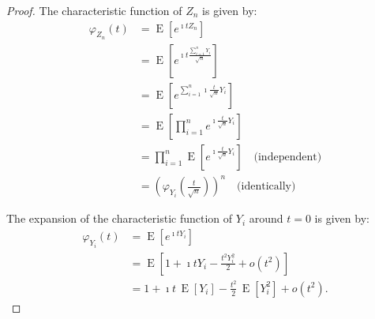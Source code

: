 \documentclass[11pt, headings=standardclasses, parskip=half, twoside]{scrartcl}
\begin{document}
\begin{proof}
The characteristic function of $Z_{n}$ is given by:
\begin{align*}
    \varphi_{Z_{n}}(t) &= \operatorname{E}\left[e^{\imath t Z_{n}}\right] \\
    &= \operatorname{E}\left[e^{\imath t \frac{\sum_{i=1}^{n} Y_{i}}{\sqrt{n}}}\right] \\
    &= \operatorname{E}\left[e^{\sum_{i=1}^{n} \imath \frac{t}{\sqrt{n}} Y_{i}}\right] \\
    &= \operatorname{E}\left[\prod_{i=1}^{n} e^{\imath \frac{t}{\sqrt{n}} Y_{i}}\right] \\
    &= \prod_{i=1}^{n} \operatorname{E}\left[e^{\imath \frac{t}{\sqrt{n}}Y_{i}}\right] \quad \text{(independent)} \\
    &= \left(\varphi_{Y_{i}}\left(\frac{t}{\sqrt{n}}\right)\right)^{n} \quad \text{(identically)}
\end{align*}


The expansion of the characteristic function of $Y_{i}$ around $t=0$ is given by:
\begin{align*}
    \varphi_{Y_{i}}(t) &= \operatorname{E}\left[e^{\imath t Y_{i}}\right] \\
    &= \operatorname{E}\left[1 + \imath t Y_{i} - \frac{t^2 Y_{i}^2}{2} + o(t^2)\right] \\
    &= 1 + \imath t\,\operatorname{E}\left[Y_{i}\right] - \frac{t^2}{2}\,\operatorname{E}\left[Y_{i}^2\right] + o(t^2).
\end{align*}


\end{proof}
\end{document}
